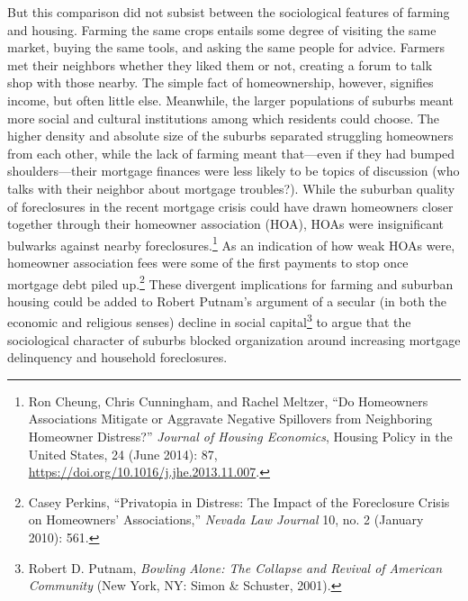 \documentclass[12pt,oneside]{psthesis}
\begin{document}
But this comparison did not subsist between the sociological features of farming and housing.
Farming the same crops entails some degree of visiting the same market, buying the same tools, and asking the same people for advice.
Farmers met their neighbors whether they liked them or not, creating a forum to talk shop with those nearby.
The simple fact of homeownership, however, signifies income, but often little else.
Meanwhile, the larger populations of suburbs meant more social and cultural institutions among which residents could choose.
The higher density and absolute size of the suburbs separated struggling homeowners from each other, while the lack of farming meant that---even if they had bumped shoulders---their mortgage finances were less likely to be topics of discussion (who talks with their neighbor about mortgage troubles?).
While the suburban quality of foreclosures in the recent mortgage crisis could have drawn homeowners closer together through their homeowner association (HOA), HOAs were insignificant bulwarks against nearby foreclosures.\footnote{Ron Cheung, Chris Cunningham, and Rachel Meltzer, ``Do Homeowners Associations Mitigate or Aggravate Negative Spillovers from Neighboring Homeowner Distress?'' \emph{Journal of Housing Economics}, Housing Policy in the United States, 24 (June 2014): 87, \url{https://doi.org/10.1016/j.jhe.2013.11.007}.}
As an indication of how weak HOAs were, homeowner association fees were some of the first payments to stop once mortgage debt piled up.\footnote{Casey Perkins, ``Privatopia in Distress: The Impact of the Foreclosure Crisis on Homeowners' Associations,'' \emph{Nevada Law Journal} 10, no. 2 (January 2010): 561.}
These divergent implications for farming and suburban housing could be added to Robert Putnam's argument of a secular (in both the economic and religious senses) decline in social capital\footnote{Robert D. Putnam, \emph{Bowling Alone: The Collapse and Revival of American Community} (New York, NY: Simon \& Schuster, 2001).} to argue that the sociological character of suburbs blocked organization around increasing mortgage delinquency and household foreclosures.
\end{document}
